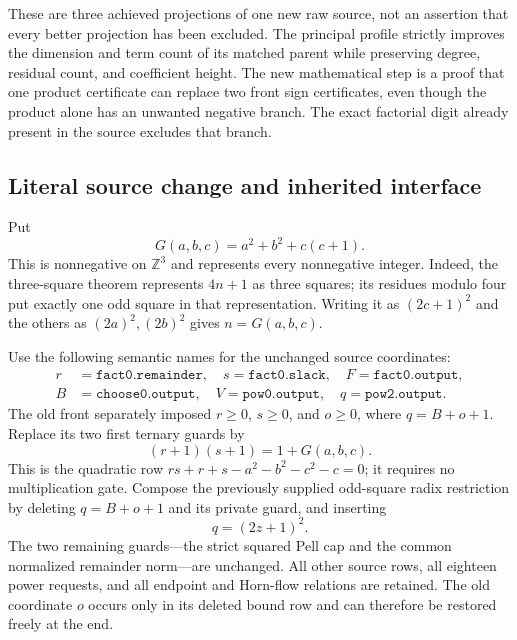 \documentclass[11pt,letterpaper]{article}
\newcommand{\Z}{\mathbb Z}
\theoremstyle{definition}
\theoremstyle{remark}
\begin{document}
These are three achieved projections of one new raw source, not an
assertion that every better projection has been excluded.  The principal
profile strictly improves the dimension and term count of its matched
parent while preserving degree, residual count, and coefficient height.
The new mathematical step is a proof that one product certificate can
replace two front sign certificates, even though the product alone has
an unwanted negative branch.  The exact factorial digit already present
in the source excludes that branch.

\subsection{Literal source change and inherited interface}

Put
\[
 G(a,b,c)=a^2+b^2+c(c+1).
\]
This is nonnegative on $\Z^3$ and represents every nonnegative integer.
Indeed, the three-square theorem represents $4n+1$ as three squares; its
residues modulo four put exactly one odd square in that representation.
Writing it as $(2c+1)^2$ and the others as $(2a)^2,(2b)^2$ gives $n=G(a,b,c)$.

Use the following semantic names for the unchanged source coordinates:
\[
\begin{split}
 r&=\texttt{fact0.remainder},\quad
 s=\texttt{fact0.slack},\quad F=\texttt{fact0.output},\\
 B&=\texttt{choose0.output},\quad
 V=\texttt{pow0.output},\quad q=\texttt{pow2.output}.
\end{split}
\]
The old front separately imposed $r\geq0$, $s\geq0$, and
$o\geq0$, where $q=B+o+1$.  Replace its two first ternary guards by
\begin{equation}
 (r+1)(s+1)=1+G(a,b,c).
 \label{eq:front-fused}
\end{equation}
This is the quadratic row $rs+r+s-a^2-b^2-c^2-c=0$; it requires no
multiplication gate.  Compose the previously supplied odd-square radix
restriction by deleting $q=B+o+1$ and its private guard, and inserting
\begin{equation}
 q=(2z+1)^2.
 \label{eq:front-odd}
\end{equation}
The two remaining guards---the strict squared Pell cap and the common
normalized remainder norm---are unchanged.  All other source rows,
all eighteen power requests, and all endpoint and Horn-flow relations
are retained.  The old coordinate $o$ occurs only in its deleted bound
row and can therefore be restored freely at the end.
\end{document}
